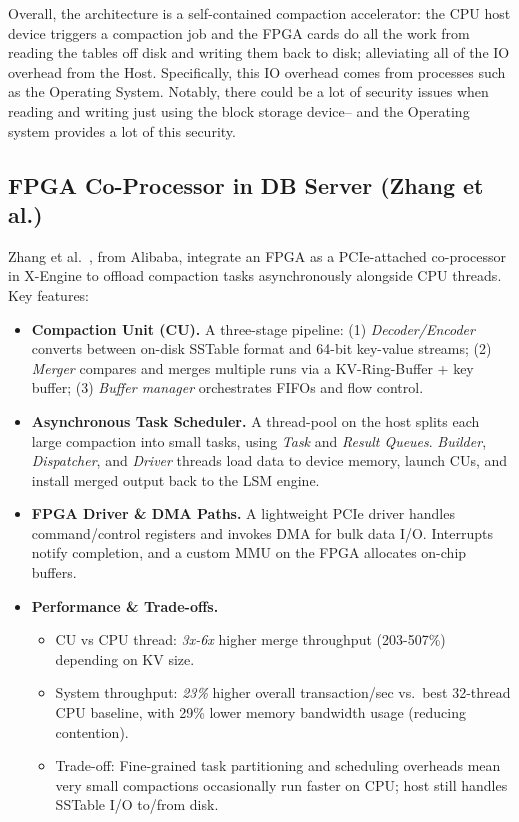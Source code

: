 \documentclass[sigconf]{acmart}
\begin{document}
    Overall, the architecture is a self-contained compaction accelerator: the CPU host device triggers a compaction job and the FPGA cards do all the work from reading the tables off disk and writing them back to disk; alleviating all of the IO overhead from the Host. Specifically, this IO overhead comes from processes such as the Operating System.
    Notably, there could be a lot of security issues when reading and writing just using the block storage device-- and the Operating system provides a lot of this security. 


  \subsection{FPGA Co-Processor in DB Server (Zhang et al.)}
  Zhang et al.~\cite{zhang2020fpga}, from Alibaba, integrate an FPGA as a PCIe-attached co-processor in X-Engine to offload compaction tasks asynchronously alongside CPU threads.  Key features:
  \begin{itemize}
    \item \textbf{Compaction Unit (CU).}
      A three-stage pipeline: 
      (1) \emph{Decoder/Encoder} converts between on-disk SSTable format and 64-bit key-value streams;  
      (2) \emph{Merger} compares and merges multiple runs via a KV-Ring-Buffer + key buffer;  
      (3) \emph{Buffer manager} orchestrates FIFOs and flow control.
    \item \textbf{Asynchronous Task Scheduler.}
      A thread-pool on the host splits each large compaction into small tasks, using \emph{Task} and \emph{Result Queues}.  \emph{Builder}, \emph{Dispatcher}, and \emph{Driver} threads load data to device memory, launch CUs, and install merged output back to the LSM engine.
    \item \textbf{FPGA Driver \& DMA Paths.}
      A lightweight PCIe driver handles command/control registers and invokes DMA for bulk data I/O.  Interrupts notify completion, and a custom MMU on the FPGA allocates on-chip buffers.
    \item \textbf{Performance \& Trade-offs.}
      \begin{itemize}
        \item CU vs CPU thread: \emph{3x-6x} higher merge throughput (203-507\%) depending on KV size.
        \item System throughput: \emph{23\%} higher overall transaction/sec vs.\ best 32-thread CPU baseline, with 29\% lower memory bandwidth usage (reducing contention).
        \item Trade-off: Fine-grained task partitioning and scheduling overheads mean very small compactions occasionally run faster on CPU; host still handles SSTable I/O to/from disk.
      \end{itemize}
  \end{itemize}
\end{document}
